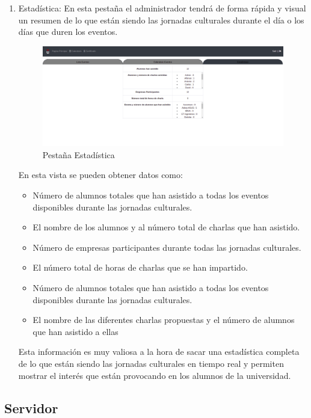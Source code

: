 \documentclass[a4paper, 12pt]{book}
\begin{document}
\begin{enumerate}
\item Estadística: En esta pestaña el administrador tendrá de forma rápida y visual un resumen de lo que están siendo las jornadas culturales durante el día o los días que duren los eventos.

	\begin{figure}[h!]
  	\centering
  	\includegraphics[width=16cm, keepaspectratio]{img/adminEstadisticas.png}
  	\caption{Pestaña Estadística}\label{fig:adminEstadisticas}
	\end{figure}
	
	En esta vista se pueden obtener datos como:
		\begin{itemize}
  			\item Número de alumnos totales que han asistido a todas los eventos disponibles durante las jornadas culturales.
  			\item El nombre de los alumnos y al número total de charlas que han asistido.
  			\item Número de empresas participantes durante todas las jornadas culturales.
  			\item El número total de horas de charlas que se han impartido.
  			\item Número de alumnos totales que han asistido a todas los eventos disponibles durante las jornadas culturales.
  			\item El nombre de las diferentes charlas propuestas y el número de alumnos que han asistido a ellas
		\end{itemize}
		
	Esta información es muy valiosa a la hora de sacar una estadística completa de lo que están siendo las jornadas culturales en tiempo real y permiten mostrar el interés que están provocando en los alumnos de la universidad.

  
\end{enumerate}

\subsection{Servidor}
\end{document}

